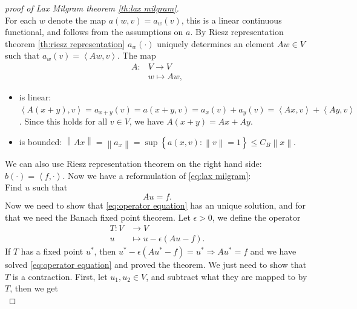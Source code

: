\documentclass[../Main/main.tex]{subfiles}
\begin{document}
	\begin{proof}[proof of Lax Milgram theorem \ref{th:lax milgram}]
		$ $\\
		For each $w$ denote the map $a(w,v) = a_w(v)$, this is a linear continuous functional, and follows from the assumptions on $a$. By Riesz representation theorem \ref{th:riesz representation} $a_w(\cdot)$ uniquely determines an element $Aw \in V$ such that $a_w(v) = \left \langle Aw,v \right \rangle$. The map
		\begin{equation*}
			\begin{aligned}
				A:&V\rightarrow V \\
				&w \mapsto Aw,
			\end{aligned}
		\end{equation*}
		\begin{itemize}
			\item 		is linear: $\left \langle A(x+y),v  \right \rangle = a_{x+y}(v) = a(x+y,v) = a_x(v)+a_y(v) = \left \langle Ax,v \right \rangle+\left \langle Ay,v \right \rangle$. Since this holds for all $v \in V$, we have $A(x+y)=Ax + Ay$.
			\item is bounded: $\left \| Ax \right \|=\left \| a_x \right \| = \sup \left \{ a(x,v):\left \| v \right \|=1 \right \} \leq C_B \left \| x \right \|$.
		\end{itemize}
		We can also use Riesz representation theorem on the right hand side: $b(\cdot)=\left \langle f,\cdot \right \rangle$. Now we have a reformulation of \eqref{eq:lax milgram}:\\
		Find $u$ such that
		\begin{equation}\label{eq:operator equation}
			Au = f.
		\end{equation}
		Now we need to show that \eqref{eq:operator equation} has an unique solution, and for that we need the Banach fixed point theorem. Let $\epsilon > 0$, we define the operator 
		\begin{equation*}
			\begin{aligned}
				T:V &\rightarrow V \\
				u &\mapsto u-\epsilon (Au-f).
			\end{aligned}
		\end{equation*}
		If $T$ has a fixed point $u^*$, then $u^*-\epsilon(Au^*-f)=u^* \Rightarrow Au^* =f$ and we have solved \eqref{eq:operator equation} and proved the theorem. We just need to show that $T$ is a contraction. First, let $u_1,u_2\in V$, and subtract what they are mapped to by $T$, then we get 
		\begin{equation*}

\end{equation*}
\end{proof}
\end{document}
